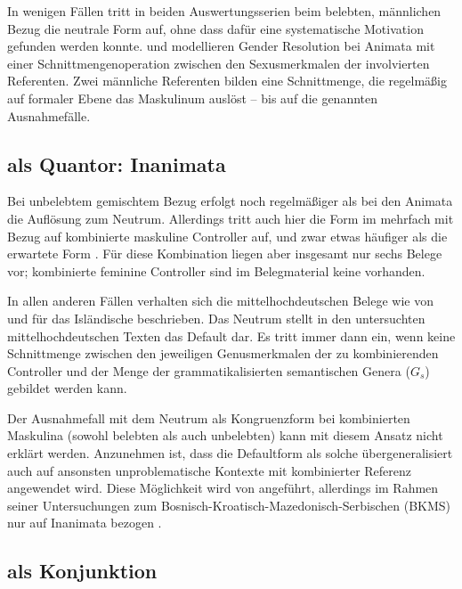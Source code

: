 In wenigen Fällen tritt in beiden Auswertungs\-serien beim belebten, männlichen
Bezug die neutrale Form auf, ohne dass dafür eine systematische Motivation
gefunden werden konnte. \citet{wechslerzlatic2003} und \citet{wechsler2009}
modellieren Gender Resolution bei Animata mit einer Schnittmengenoperation
zwischen den Sexusmerkmalen der involvierten Referenten. Zwei männliche
Referenten bilden eine Schnittmenge, die regelmäßig auf formaler Ebene das
Maskulinum auslöst -- bis auf die genannten Ausnahmefälle.

\subsection{ als Quantor: Inanimata}

Bei unbelebtem gemischtem Bezug erfolgt noch regelmäßiger als bei den Animata
die Auflösung zum Neutrum. Allerdings tritt auch hier die Form
 im \CAO{} mehrfach mit Bezug auf kombinierte
maskuline Controller auf, und zwar etwas häufiger als die erwartete Form
. Für diese Kombination liegen aber insgesamt nur sechs Belege vor;
kombinierte feminine Controller sind im Belegmaterial keine vorhanden.

In allen anderen Fällen verhalten sich die
mittelhochdeutschen Belege wie von
\citet{wechslerzlatic2003} und \citet{wechsler2009} für das Isländische
beschrieben. Das Neutrum stellt in den untersuchten
mittelhochdeutschen Texten das Default dar. Es tritt
immer dann ein, wenn keine Schnittmenge zwischen den jeweiligen Genusmerkmalen
der zu kombinierenden Controller und der Menge der grammatikalisierten
semantischen Genera ($G_s$) gebildet werden kann.

Der Ausnahmefall mit dem Neutrum als Kongruenzform bei kombinierten Maskulina
(sowohl belebten als auch unbelebten) kann mit diesem Ansatz nicht erklärt
werden. Anzunehmen ist, dass die Defaultform als solche übergeneralisiert auch
auf ansonsten unproblematische Kontexte mit kombinierter Referenz angewendet
wird. Diese Möglichkeit wird von \citet[302]{corbett1991} angeführt,
allerdings im Rahmen seiner Untersuchungen zum
Bosnisch-\allowbreak{}Kroatisch-\allowbreak{}Mazedonisch-\allowbreak{}Serbischen
(BKMS) nur auf Inanimata bezogen
\autocites[vgl.~auch][190]{wechslerzlatic2003}[581]{wechsler2009}.

\subsection{ als Konjunktion}

